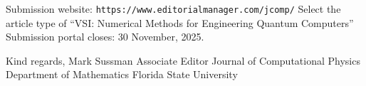 \documentclass[]{article}
\begin{document}
Submission website:
\verb=https://www.editorialmanager.com/jcomp/=
Select the article type of ``VSI: Numerical Methods for Engineering Quantum Computers''
Submission portal closes: 30 November, 2025.

Kind regards,
Mark Sussman
Associate Editor Journal of Computational Physics
Department of Mathematics
Florida State University
\par\noindent

\end{document}
